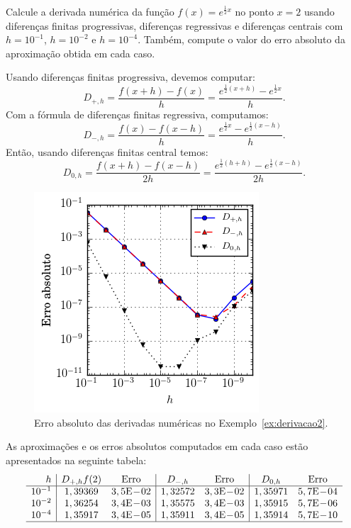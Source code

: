 \begin{ex}\label{ex:derivacao2}
Calcule a derivada numérica da função $f(x)=e^{\frac{1}{2}x}$ no ponto $x=2$ usando diferenças finitas progressivas, diferenças regressivas e diferenças centrais com $h=10^{-1}$, $h=10^{-2}$ e $h=10^{-4}$. Também, compute o valor do erro absoluto da aproximação obtida em cada caso.
\end{ex}
\begin{sol}
Usando diferenças finitas progressiva, devemos computar:
\begin{equation*}
  D_{+,h} = \frac{f(x+h) - f(x)}{h} = \frac{e^{\frac{1}{2}(x+h)} - e^{\frac{1}{2}x}}{h}.
\end{equation*}
Com a fórmula de diferenças finitas regressiva, computamos:
\begin{equation*}
  D_{-,h} = \frac{f(x) - f(x-h)}{h} = \frac{e^{\frac{1}{2}x} - e^{\frac{1}{2}(x-h)}}{h}.
\end{equation*}
Então, usando diferenças finitas central temos:
\begin{equation*}
  D_{0,h} = \frac{f(x+h) - f(x-h)}{2h} = \frac{e^{\frac{1}{2}(h+h)} - e^{\frac{1}{2}(x-h)}}{2h}.
\end{equation*}

\begin{figure}
  \centering
  \includegraphics{./cap_derivacao/pics/ex_derivacao2/ex_derivacao2}
  \caption{Erro absoluto das derivadas numéricas no Exemplo~\ref{ex:derivacao2}.}
  \label{fig:ex_derivacao}
\end{figure}

As aproximações e os erros absolutos computados em cada caso estão apresentados na seguinte tabela:
\begin{equation*}
  \begin{array}{r|cc|cc|cc}
    h  & D_{+,h}f(2) & \text{Erro} & D_{-,h} & \text{Erro} & D_{0,h} & \text{Erro} \\\hline
    10^{-1} & 1,39369 & 3,5\E-02   & 1,32572 & 3,3\E-02 & 1,35971 & 5,7\E-04\\
    10^{-2} & 1,36254 & 3,4\E-03   & 1,35575 & 3,4\E-03 & 1,35915 & 5,7\E-06\\
    10^{-4} & 1,35917 & 3,4\E-05   & 1,35911 & 3,4\E-05 & 1,35914 & 5,7\E-10\\\hline
    \multicolumn{7}{c}{}
  \end{array}
\end{equation*}
\end{sol}


